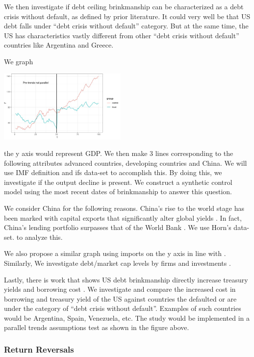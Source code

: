 \documentclass[
  12pt]{article}
\begin{document}
We then investigate if debt ceiling brinkmanship can be characterized as
a debt crisis without default, as defined by prior literature. It could
very well be that US debt falls under ``debt crisis without default''
category. But at the same time, the US has characteristics vastly
different from other ``debt crisis without default'' countries like
Argentina and Greece.

We graph

\includegraphics[width=2.47917in,height=\textheight]{style-guide/1_year_ERP_parallel_trends.jpeg}

the y axis would represent GDP. We then make 3 lines corresponding to
the following attributes advanced countries, developing countries and
China. We will use IMF definition and ifs data-set to accomplish this.
By doing this, we investigate if the output decline \citep{yeyati2011}
is present. We construct a synthetic control model using the most recent
dates of brinkmanship to answer this question.

We consider China for the following reasons. China's rise to the world
stage has been marked with capital exports that significantly alter
global yields \citep{alfaro2014, gourinchas}. In fact, China's lending
portfolio surpasses that of the World Bank \citep{horn2021} . We use
Horn's data-set. to analyze this.

We also propose a similar graph using imports on the y axis in line with
\citep{mendoza2012}. Similarly, We investigate debt/market cap levels by
firms \citep{corsetti2012, das2010, gourinchas2016} and investments
\citep{almeida2017}.

Lastly, there is work that shows US debt brinkmanship directly increase
treasury yields and borrowing cost \citep{nippani2017}. We investigate
and compare the increased cost in borrowing and treasury yield of the US
against countries the defaulted or are under the category of ``debt
crisis without default''. Examples of such countries would be Argentina,
Spain, Venezuela, etc. The study would be implemented in a parallel
trends assumptions test as shown in the figure above.

\hypertarget{return-reversals}{%
\subsubsection{Return Reversals}\label{return-reversals}}
\end{document}

